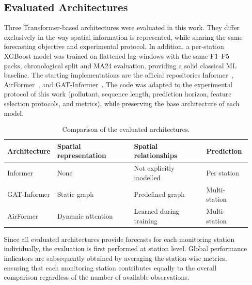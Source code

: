 \documentclass[11pt]{article}
\begin{document}
\subsection{Evaluated Architectures}
\label{sec:methodology-gat}
Three Transformer-based architectures were evaluated in this work. They differ exclusively in the way spatial information is represented, while sharing the same forecasting objective and experimental protocol. In addition, a per-station XGBoost model was trained on flattened lag windows with the same F1--F5 packs, chronological split and MA24 evaluation, providing a solid classical ML baseline. The starting implementations are the official repositories Informer~\cite{Zhou2021Informer,Zhou2023InformerEx}, AirFormer~\cite{liang2022airformer}, and GAT-Informer~\cite{YU2023110864}. The code was adapted to the experimental protocol of this work (pollutant, sequence length, prediction horizon, feature selection protocols, and metrics), while preserving the base architecture of each model.

\begin{table}[H]
\centering
\caption{Comparison of the evaluated architectures.}
\label{tab:architectures}
\renewcommand{\arraystretch}{1.15}
\begin{tabular}{p{3cm}p{3cm}p{3.2cm}p{2.5cm}}
\toprule
\textbf{Architecture} &
\textbf{Spatial representation} &
\textbf{Spatial relationships} &
\textbf{Prediction}\\
\midrule
Informer &
None &
Not explicitly modelled &
Per station \\
GAT-Informer &
Static graph &
Predefined graph &
Multi-station \\
AirFormer &
Dynamic attention &
Learned during training &
Multi-station \\
\bottomrule
\end{tabular}
\end{table}

Since all evaluated architectures provide forecasts for each monitoring station individually, the evaluation is first performed at station level. Global performance indicators are subsequently obtained by averaging the station-wise metrics, ensuring that each monitoring station contributes equally to the overall comparison regardless of the number of available observations.
\end{document}
